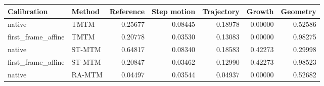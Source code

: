 \begin{tabular}{llrrrrr}
Calibration & Method & Reference & Step motion & Trajectory & Growth & Geometry \\
\hline
native & TMTM & 0.25677 & 0.08445 & 0.18978 & 0.00000 & 0.52586 \\
first\_frame\_affine & TMTM & 0.20778 & 0.03530 & 0.13083 & 0.00000 & 0.98275 \\
native & ST-MTM & 0.64817 & 0.08340 & 0.18583 & 0.42273 & 0.29998 \\
first\_frame\_affine & ST-MTM & 0.20847 & 0.03462 & 0.12990 & 0.42273 & 0.98523 \\
native & RA-MTM & 0.04497 & 0.03544 & 0.04937 & 0.00000 & 0.52682 \\
\end{tabular}
